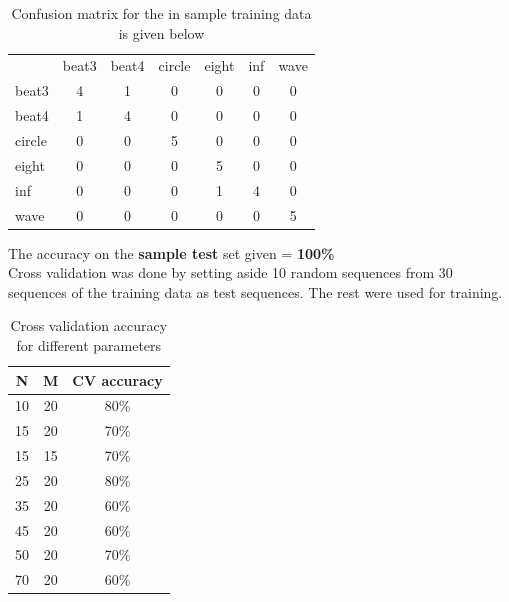 \documentclass[english]{article}
\begin{document}
\begin{table}[h]
\centering
\caption{Confusion matrix for the in sample training data is given below}
\label{my-label1}
\begin{tabular}{lcccccc}
       & beat3                     & beat4                     & circle                    & eight                     & inf                       & wave                      \\
beat3  & \cellcolor[HTML]{FFFFC7}4 & 1                         & 0                         & 0                         & 0                         & 0                         \\
beat4  & 1                         & \cellcolor[HTML]{FFFFC7}4 & 0                         & 0                         & 0                         & 0                         \\
circle & 0                         & 0                         & \cellcolor[HTML]{FFFFC7}5 & 0                         & 0                         & 0                         \\
eight  & 0                         & 0                         & 0                         & \cellcolor[HTML]{FFFFC7}5 & 0                         & 0                         \\
inf    & 0                         & 0                         & 0                         & 1                         & \cellcolor[HTML]{FFFFC7}4 & 0                         \\
wave   & 0                         & 0                         & 0                         & 0                         & 0                         & \cellcolor[HTML]{FFFFC7}5
\end{tabular}
\end{table}


The accuracy on the \textbf{sample test} set given = \textbf{100\%} \\ 

Cross validation was done by setting aside 10 random sequences from 30 sequences of the training data as test sequences. The rest were used for training.  \\

\begin{table}[h]
\centering
\caption{Cross validation accuracy for different parameters}
\begin{tabular}{|c|c|c|}
\hline
\textbf{N} & \textbf{M} & \textbf{CV accuracy} \\ \hline
10 & 20 & 80\% \\ \hline
15 & 20 & 70\% \\ \hline
15 & 15 & 70\% \\ \hline
25 & 20 & 80\% \\ \hline
35 & 20 & 60\% \\ \hline
45 & 20 & 60\% \\ \hline
50 & 20 & 70\% \\ \hline
70 & 20 & 60\% \\ \hline
\end{tabular}
\end{table} 
\end{document}
